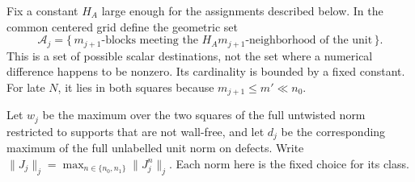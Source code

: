 Fix a constant \(H_A\) large enough for the assignments described
below.  In the common centered grid define the geometric set
\begin{equation}\label{obs:affected-set}
 \mathcal A_j=
 \{\,m_{j+1}\text{-blocks meeting the }H_A m_{j+1}
                         \text{-neighborhood of the unit}\,\}.
\end{equation}
This is a set of possible scalar destinations, not the set where a
numerical difference happens to be nonzero.  Its cardinality is
bounded by a fixed constant.  For late \(N\), it lies in both squares
because \(m_{j+1}\le m'\ll n_0\).

Let \(w_j\) be the maximum over the two squares of the full untwisted
norm restricted to supports that are not wall-free, and let \(d_j\)
be the corresponding maximum of the full unlabelled unit norm on
defects.  Write \(\|J_j\|_j=\max_{n\in\{n_0,n_1\}}\|J_j^n\|_j\).
Each norm here is the fixed choice for its class.

